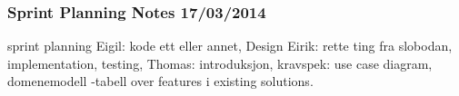 \subsubsection{Sprint Planning Notes 17/03/2014}

sprint planning\newline
Eigil: kode ett eller annet, Design\newline
Eirik: rette ting fra slobodan, implementation, testing, \newline
Thomas: introduksjon, kravspek: use case diagram, domenemodell\newline
-tabell over features i existing solutions.\newline

